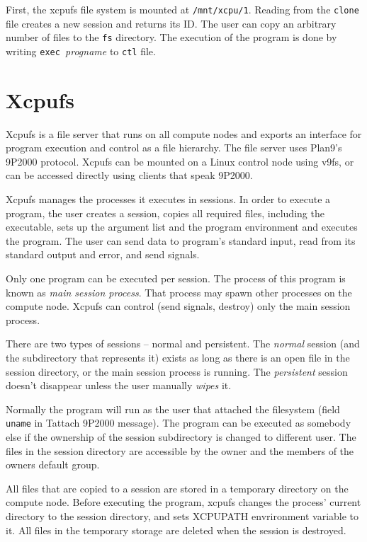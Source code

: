 \documentclass[draft]{article}
\begin{document}
First, the xcpufs file system is mounted at \verb|/mnt/xcpu/1|. Reading from
the \verb|clone| file creates a new session and returns its ID. The user can
copy an arbitrary number of files to the \verb|fs| directory. The execution
of the program is done by writing \verb|exec |{\sl progname} to \verb|ctl|
file.

\section{Xcpufs}
Xcpufs is a file server that runs on all compute nodes and exports an
interface for program execution and control as a file hierarchy. The file
server uses Plan9's 9P2000 protocol. Xcpufs can be mounted on a Linux
control node using v9fs, or can be accessed directly using clients that
speak 9P2000. 

Xcpufs manages the processes it executes in sessions. In order to execute a
program, the user creates a session, copies all required files, including
the executable, sets up the argument list and the program environment and
executes the program. The user can send data to program's standard input,
read from its standard output and error, and send signals.

Only one program can be executed per session. The process of this program is
known as {\sl main session process}. That process may spawn other processes
on the compute node. Xcpufs can control (send signals, destroy) only the
main session process. 

There are two types of sessions -- normal and persistent. The {\sl normal}
session (and the subdirectory that represents it) exists as long as there is
an open file in the session directory, or the main session process is
running. The {\sl persistent} session doesn't disappear unless the user
manually {\sl wipes} it. 

Normally the program will run as the user that attached the filesystem
(field \verb|uname| in Tattach 9P2000 message). The program can be executed
as somebody else if the ownership of the session subdirectory is changed to
different user. The files in the session directory are accessible by the
owner and the members of the owners default group.

All files that are copied to a session are stored in a temporary directory
on the compute node. Before executing the program, xcpufs changes the
process' current directory to the session directory, and sets XCPUPATH
envrironment variable to it. All files in the temporary storage are
deleted when the session is destroyed.
\end{document}
